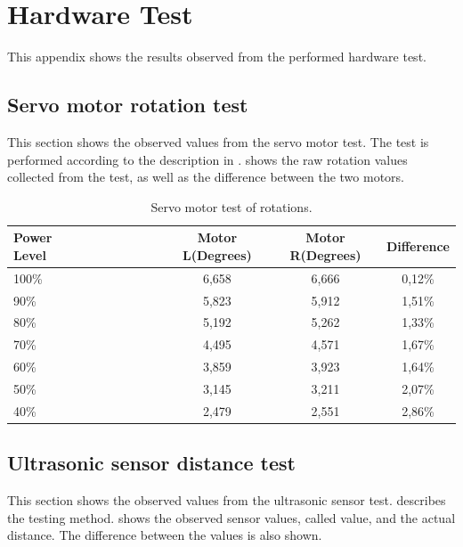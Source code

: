 \chapter{Hardware Test} \label{app:hardware_test}
This appendix shows the results observed from the performed hardware test.

\section{Servo motor rotation test} \label{app:servo_motor_test}
This section shows the observed values from the servo motor test. The test is performed according to the description in .  shows the raw rotation values collected from the test, as well as the difference between the two motors. 

\begin{table}[H]
	\centering
    \begin{tabular}{lccc}
    \hline  
    \rowcolor{DGray}
    \textbf{Power Level}~~~~~~~~~~~~ & Motor L(Degrees) & Motor R(Degrees) & Difference \\ \hline 
    100\%                  & 6,658                  & 6,666                & 0,12\% \\
    90\%                   & 5,823                  & 5,912                & 1,51\% \\
    80\%                   & 5,192                  & 5,262                & 1,33\% \\
    70\%                   & 4,495                  & 4,571                & 1,67\% \\
    60\%                   & 3,859                  & 3,923                & 1,64\% \\
    50\%                   & 3,145                  & 3,211                & 2,07\% \\
    40\%                   & 2,479                  & 2,551                & 2,86\% \\
    \hline  
    \end{tabular}
    \caption{\label{table:app_motor_test}Servo motor test of rotations.}
\end{table}


\section{Ultrasonic sensor distance test} \label{app:ultrasonic_sensor_test}
This section shows the observed values from the ultrasonic sensor test.  describes the testing method.  shows the observed sensor values, called value, and the actual distance. The difference between the values is also shown. 

